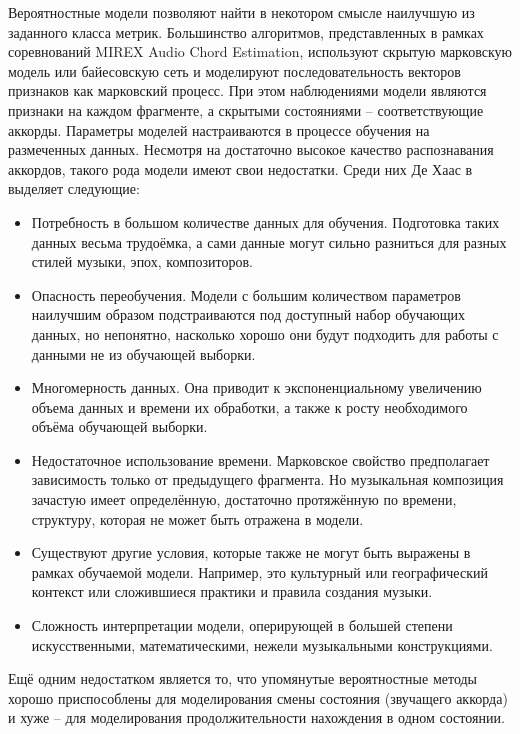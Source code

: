 Вероятностные модели позволяют найти в некотором смысле наилучшую из заданного
класса метрик. Большинство алгоритмов, представленных в рамках соревнований
MIREX Audio Chord Estimation, используют скрытую марковскую модель или
байесовскую сеть и моделируют последовательность векторов признаков как
марковский процесс. При этом наблюдениями модели являются признаки на каждом
фрагменте, а скрытыми состояниями -- соответствующие аккорды. Параметры моделей
настраиваются в процессе обучения на размеченных данных. Несмотря на достаточно
высокое качество распознавания аккордов, такого рода модели имеют свои
недостатки. Среди них Де Хаас в \cite{DeHaas2012} выделяет следующие:
\begin{itemize}
  \item Потребность в большом количестве данных для обучения. Подготовка таких
  данных весьма трудоёмка, а сами данные могут сильно разниться для разных
  стилей музыки, эпох, композиторов.
  
  \item Опасность переобучения. Модели с большим количеством параметров
  наилучшим образом подстраиваются под доступный набор обучающих данных, но
  непонятно, насколько хорошо они будут подходить для работы с данными не из
  обучающей выборки.
  
  \item Многомерность данных. Она приводит к экспоненциальному увеличению объема
  данных и времени их обработки, а также к росту необходимого объёма обучающей
  выборки.
  
  \item Недостаточное использование времени. Марковское свойство предполагает
  зависимость только от предыдущего фрагмента. Но музыкальная композиция
  зачастую имеет определённую, достаточно протяжённую по времени, структуру,
  которая не может быть отражена в модели.
  
  \item Существуют другие условия, которые также не могут быть выражены в рамках
  обучаемой модели. Например, это культурный или географический контекст или
  сложившиеся практики и правила создания музыки.
  
  \item Сложность интерпретации модели, оперирующей в большей степени
  искусственными, математическими, нежели музыкальными конструкциями.
\end{itemize}

Ещё одним недостатком является то, что упомянутые вероятностные методы хорошо
приспособлены для моделирования смены состояния (звучащего аккорда) и хуже --
для моделирования продолжительности нахождения в одном состоянии.

